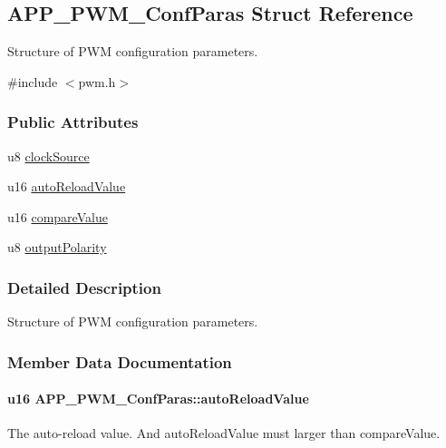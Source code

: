 \hypertarget{struct_a_p_p___p_w_m___conf_paras}{}\subsection{A\+P\+P\+\_\+\+P\+W\+M\+\_\+\+Conf\+Paras Struct Reference}
\label{struct_a_p_p___p_w_m___conf_paras}


Structure of P\+WM configuration parameters.  




{\ttfamily \#include $<$pwm.\+h$>$}

\subsubsection*{Public Attributes}
\begin{DoxyCompactItemize}
\item 
u8 \hyperlink{struct_a_p_p___p_w_m___conf_paras_a4a1122dc4e7795bf1e1f47538b147ea8}{clock\+Source}
\item 
u16 \hyperlink{struct_a_p_p___p_w_m___conf_paras_a6efac425ee771c9d85a85940a022259e}{auto\+Reload\+Value}
\item 
u16 \hyperlink{struct_a_p_p___p_w_m___conf_paras_ae1b5fa4abd18a81a39127faab92469c6}{compare\+Value}
\item 
u8 \hyperlink{struct_a_p_p___p_w_m___conf_paras_afff5a21a187609a5b3e82285062081d9}{output\+Polarity}
\end{DoxyCompactItemize}


\subsubsection{Detailed Description}
Structure of P\+WM configuration parameters. 

\subsubsection{Member Data Documentation}
\paragraph[{\texorpdfstring{auto\+Reload\+Value}{autoReloadValue}}]{\setlength{\rightskip}{0pt plus 5cm}u16 A\+P\+P\+\_\+\+P\+W\+M\+\_\+\+Conf\+Paras\+::auto\+Reload\+Value}\hypertarget{struct_a_p_p___p_w_m___conf_paras_a6efac425ee771c9d85a85940a022259e}{}\label{struct_a_p_p___p_w_m___conf_paras_a6efac425ee771c9d85a85940a022259e}
The auto-\/reload value. And auto\+Reload\+Value must larger than compare\+Value. 

